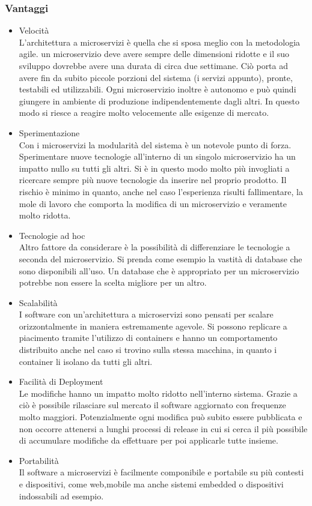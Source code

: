 \subsubsection{Vantaggi}
\begin{itemize}
	\item  Velocità \\
	L'architettura a microservizi è quella che si sposa meglio con la metodologia agile. un microservizio deve avere sempre delle dimensioni ridotte e il suo sviluppo  dovrebbe avere una durata di circa due settimane. Ciò porta ad avere fin da subito piccole porzioni del sistema (i servizi appunto), pronte, testabili ed utilizzabili. Ogni microservizio inoltre è autonomo e può quindi giungere in ambiente di produzione indipendentemente dagli altri. In questo modo si riesce a reagire molto velocemente alle esigenze di mercato.
	
	\item Sperimentazione \\
	Con i microservizi la modularità del sistema è un notevole punto di forza. Sperimentare nuove tecnologie all'interno di un singolo microservizio ha un impatto nullo su tutti gli altri. Si è in questo modo molto più invogliati a ricercare sempre più nuove tecnologie da inserire nel proprio prodotto. Il rischio è minimo in quanto, anche nel caso l'esperienza risulti fallimentare, la mole di lavoro che comporta la modifica di un microservizio e veramente molto ridotta.
	
	\item Tecnologie ad hoc \\
	Altro fattore da considerare è la possibilità di differenziare le tecnologie a seconda del microservizio. Si prenda come esempio la vastità di database che sono disponibili all'uso. Un database che è appropriato per un microservizio potrebbe non essere la scelta migliore per un altro. 
	
	\item Scalabilità \\
	I software con un'architettura a microservizi sono pensati per scalare orizzontalmente in maniera estremamente agevole. Si possono replicare a piacimento tramite l'utilizzo di containers e hanno un comportamento distribuito anche nel caso si trovino sulla stessa macchina, in quanto i container li isolano da tutti gli altri.
	
	\item Facilità di Deployment \\
	Le modifiche hanno un impatto molto ridotto nell'interno sistema. Grazie a ciò è possibile rilasciare sul mercato il software aggiornato con frequenze molto maggiori. Potenzialmente ogni modifica può subito essere pubblicata e non occorre attenersi a lunghi processi di release in cui si cerca il più possibile di accumulare modifiche da effettuare per poi applicarle tutte insieme.
	
	\item Portabilità \\
	Il software a microservizi è facilmente componibile e portabile su più contesti e dispositivi, come web,mobile ma anche sistemi embedded o dispositivi indossabili ad esempio.	
\end{itemize}

